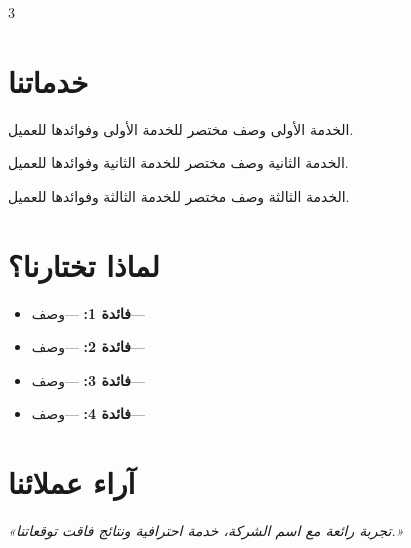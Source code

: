 \documentclass[11pt,a4paper,landscape]{article}
\begin{document}
\begin{multicols}{3}
\section{خدماتنا}

\begin{featurebox}{الخدمة الأولى}
وصف مختصر للخدمة الأولى وفوائدها للعميل.
\end{featurebox}

\vspace{0.3em}

\begin{featurebox}{الخدمة الثانية}
وصف مختصر للخدمة الثانية وفوائدها للعميل.
\end{featurebox}

\vspace{0.3em}

\begin{featurebox}{الخدمة الثالثة}
وصف مختصر للخدمة الثالثة وفوائدها للعميل.
\end{featurebox}

\section{لماذا تختارنا؟}
\begin{itemize}[topsep=0.2em,itemsep=0.2em,leftmargin=1.2em]
    \item \textbf{فائدة 1:} ---وصف---
    \item \textbf{فائدة 2:} ---وصف---
    \item \textbf{فائدة 3:} ---وصف---
    \item \textbf{فائدة 4:} ---وصف---
\end{itemize}

\section{آراء عملائنا}

\begin{testimonialbox}
\itshape\small
«تجربة رائعة مع اسم الشركة، خدمة احترافية%
ونتائج فاقت توقعاتنا.»


\end{testimonialbox}
\end{multicols}
\end{document}
